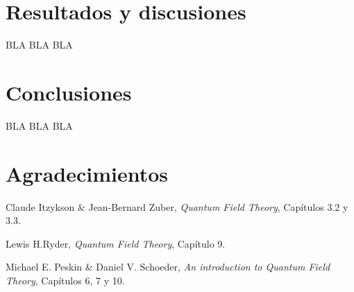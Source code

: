\documentclass[12pt,a4paper]{article}
\numberwithin{equation}{section}
\begin{document}
\section{Resultados y discusiones}

BLA BLA BLA

\section{Conclusiones}

BLA BLA BLA

\section{Agradecimientos}

\begin{thebibliography}{9}
	
	Claude Itzykson \& Jean-Bernard Zuber,
	\textit{Quantum Field Theory},
	Capítulos 3.2 y 3.3.
	
	Lewis H.Ryder,
	\textit{Quantum Field Theory},
	Capítulo 9.
	
	Michael E. Peskin \& Daniel V. Schoeder,
	\textit{An introduction to Quantum Field Theory},
	Capítulos 6, 7 y 10.
	
\end{thebibliography}
\end{document}
